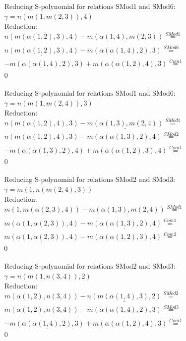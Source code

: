 \documentclass[11pt]{amsart}
\begin{document}
\begin{align*} 
& \text{Reducing S-polynomial for relations SMod1 and SMod6:} \\ 
& \gamma = n(m(1,m(2,3)),4) \\ 
& \text{Reduction}: \\&n(m(\alpha(1,2),3),4) - \underline{m(\alpha(1,4),m(2,3))} \stackrel{ SMod1 }{=}  \\ 
&\underline{n(m(\alpha(1,2),3),4)} - m(\alpha(\alpha(1,4),2),3) \stackrel{ SMod6 }{=}  \\ 
& - \underline{m(\alpha(\alpha(1,4),2),3)} + m(\alpha(\alpha(1,2),4),3) \stackrel{ Com1 }{=}  \\ 
&0\\ 
\end{align*} 
 
\begin{align*} 
& \text{Reducing S-polynomial for relations SMod1 and SMod6:} \\ 
& \gamma = n(m(1,m(2,4)),3) \\ 
& \text{Reduction}: \\&n(m(\alpha(1,2),4),3) - \underline{m(\alpha(1,3),m(2,4))} \stackrel{ SMod1 }{=}  \\ 
&\underline{n(m(\alpha(1,2),4),3)} - m(\alpha(\alpha(1,3),2),4) \stackrel{ SMod2 }{=}  \\ 
& - \underline{m(\alpha(\alpha(1,3),2),4)} + m(\alpha(\alpha(1,2),3),4) \stackrel{ Com1 }{=}  \\ 
&0\\ 
\end{align*} 
 
\begin{align*} 
& \text{Reducing S-polynomial for relations SMod2 and SMod3:} \\ 
& \gamma = m(1,n(m(2,4),3)) \\ 
& \text{Reduction}: \\&\underline{m(1,m(\alpha(2,3),4))} - \underline{m(\alpha(1,3),m(2,4))} \stackrel{ SMod1 }{=}  \\ 
&m(\alpha(1,\alpha(2,3)),4) - \underline{m(\alpha(\alpha(1,3),2),4)} \stackrel{ Com1 }{=}  \\ 
&\underline{m(\alpha(1,\alpha(2,3)),4)} - m(\alpha(\alpha(1,2),3),4) \stackrel{ Com2 }{=}  \\ 
&0\\ 
\end{align*} 
 
\begin{align*} 
& \text{Reducing S-polynomial for relations SMod2 and SMod3:} \\ 
& \gamma = n(m(1,n(3,4)),2) \\ 
& \text{Reduction}: \\&m(\alpha(1,2),n(3,4)) - \underline{n(m(\alpha(1,4),3),2)} \stackrel{ SMod2 }{=}  \\ 
&\underline{m(\alpha(1,2),n(3,4))} - m(\alpha(\alpha(1,4),2),3) \stackrel{ SMod3 }{=}  \\ 
& - \underline{m(\alpha(\alpha(1,4),2),3)} + m(\alpha(\alpha(1,2),4),3) \stackrel{ Com1 }{=}  \\ 
&0\\ 
\end{align*} 
 
\end{document}
